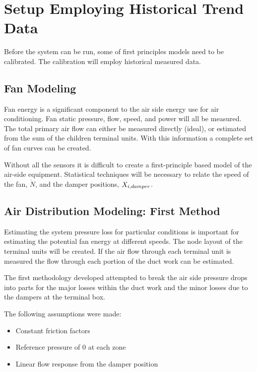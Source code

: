 \section{Setup Employing Historical Trend Data}

Before the system can be run, some of first principles models need to be calibrated. The calibration will employ historical measured data.

\subsection{Fan Modeling}\label{sec:FanModeling}

Fan energy is a significant component to the air side energy use for air conditioning. Fan static pressure, flow, speed, and power will all be measured. The total primary air flow can either be measured directly (ideal), or estimated from the sum of the children terminal units. With this information a complete set of fan curves can be created. 

Without all the sensors it is difficult to create a first-principle based model of the air-side equipment. Statistical techniques will be necessary to relate the speed of the fan, \(\dot N\), and the damper positions, \(X_{i,damper}\). 

\subsection{Air Distribution Modeling: First Method}

Estimating the system pressure loss for particular conditions is important for estimating the potential fan energy at different speeds. The node layout of the terminal units will be created. If the air flow through each terminal unit is measured the flow through each portion of the duct work can be estimated. 

The first methodology developed attempted to break the air side pressure drops into parts for the major losses within the duct work and the minor losses due to the dampers at the terminal box. 

The following assumptions were made:

\begin{itemize}
    \item Constant friction factors
    \item Reference pressure of 0 at each zone
    \item Linear flow response from the damper position
\end{itemize}

